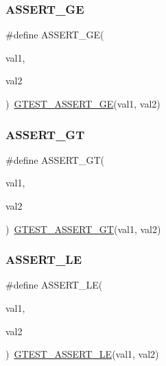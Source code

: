 \subsubsection{\texorpdfstring{ASSERT\_GE}{ASSERT\_GE}}
{\footnotesize\ttfamily \#define A\+S\+S\+E\+R\+T\+\_\+\+GE(\begin{DoxyParamCaption}\item[{}]{val1,  }\item[{}]{val2 }\end{DoxyParamCaption})~\mbox{\hyperlink{_obj__test_2lib_2googletest-release-1_88_81_2googletest_2include_2gtest_2gtest_8h_a55373d99c079ff1b894e2eb5bcd15c5a}{G\+T\+E\+S\+T\+\_\+\+A\+S\+S\+E\+R\+T\+\_\+\+GE}}(val1, val2)}

\mbox{\label{_obj__test_2lib_2googletest-release-1_88_81_2googletest_2include_2gtest_2gtest_8h_a16a882d4eafc9f8643867aea40879140}} 
\subsubsection{\texorpdfstring{ASSERT\_GT}{ASSERT\_GT}}
{\footnotesize\ttfamily \#define A\+S\+S\+E\+R\+T\+\_\+\+GT(\begin{DoxyParamCaption}\item[{}]{val1,  }\item[{}]{val2 }\end{DoxyParamCaption})~\mbox{\hyperlink{_obj__test_2lib_2googletest-release-1_88_81_2googletest_2include_2gtest_2gtest_8h_a088b9056fd1c1f316b41c22f64deb33a}{G\+T\+E\+S\+T\+\_\+\+A\+S\+S\+E\+R\+T\+\_\+\+GT}}(val1, val2)}

\mbox{\label{_obj__test_2lib_2googletest-release-1_88_81_2googletest_2include_2gtest_2gtest_8h_a775643748feff0b490aae651d041e971}} 
\subsubsection{\texorpdfstring{ASSERT\_LE}{ASSERT\_LE}}
{\footnotesize\ttfamily \#define A\+S\+S\+E\+R\+T\+\_\+\+LE(\begin{DoxyParamCaption}\item[{}]{val1,  }\item[{}]{val2 }\end{DoxyParamCaption})~\mbox{\hyperlink{_obj__test_2lib_2googletest-release-1_88_81_2googletest_2include_2gtest_2gtest_8h_abef04dcd4a0259d378de7b3b3ffb6730}{G\+T\+E\+S\+T\+\_\+\+A\+S\+S\+E\+R\+T\+\_\+\+LE}}(val1, val2)}

